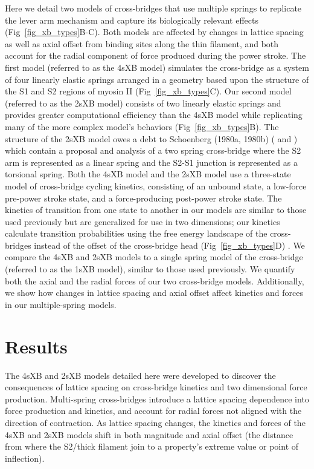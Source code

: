\documentclass[10pt]{article}
\newcommand{\citep}[1]{\cite{#1}} %
\begin{document}
Here we detail two models of cross-bridges that use multiple springs to replicate the lever arm mechanism and capture its biologically relevant effects (Fig~\ref{fig_xb_types}B-C).  
Both models are affected by changes in lattice spacing as well as axial offset from binding sites along the thin filament, and both account for the radial component of force produced during the power stroke.  
The first model (referred to as the 4sXB model) simulates the cross-bridge as a system of four linearly elastic springs arranged in a geometry based upon the structure of the S1 and S2 regions of myosin II (Fig~\ref{fig_xb_types}C).  
Our second model (referred to as the 2sXB model) consists of two linearly elastic springs and provides greater computational efficiency than the 4sXB model while replicating many of the more complex model's behaviors (Fig~\ref{fig_xb_types}B). 
The structure of the 2sXB model owes a debt to Schoenberg (1980a, 1980b) (\citep{Schoenberg1980a} and \citep{Schoenberg1980b}) which contain a proposal and analysis of a two spring cross-bridge where the S2 arm is represented as a linear spring and the S2-S1 junction is represented as a torsional spring. 
Both the 4sXB model and the 2sXB model use a three-state model of cross-bridge cycling kinetics, consisting of an unbound state, a low-force pre-power stroke state, and a force-producing post-power stroke state. 
The kinetics of transition from one state to another in our models are similar to those used previously but are generalized for use in two dimensions; our kinetics calculate transition probabilities using the free energy landscape of the cross-bridges instead of the offset of the cross-bridge head (Fig~\ref{fig_xb_types}D) \citep{Pate1989, Daniel1998, Takagi2004, Tanner2007}. 
We compare the 4sXB and 2sXB models to a single spring model of the cross-bridge (referred to as the 1sXB model), similar to those used previously. 
We quantify both the axial and the radial forces of our two cross-bridge models. 
Additionally, we show how changes in lattice spacing and axial offset affect kinetics and forces in our multiple-spring models. 


\section*{Results} %

The 4sXB and 2sXB models detailed here were developed to discover the consequences of lattice spacing on cross-bridge kinetics and two dimensional force production.
Multi-spring cross-bridges introduce a lattice spacing dependence into force production and kinetics, and account for radial forces not aligned with the direction of contraction. 
As lattice spacing changes, the kinetics and forces of the 4sXB and 2sXB models shift in both magnitude and axial offset (the distance from where the S2/thick filament join to a property's extreme value or point of inflection).
\end{document}
